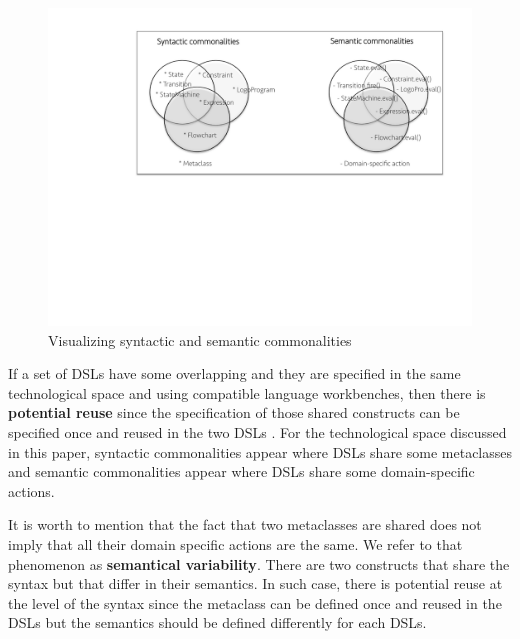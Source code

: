 \begin{figure}
\centering
\includegraphics[width=1\linewidth]{images/domains-inaction.pdf}
\caption{Visualizing syntactic and semantic commonalities}
\label{fig:shape}
\end{figure}

If a set of DSLs have some overlapping and they are specified in the same technological space and using compatible language workbenches, then there is \textbf{potential reuse} since the specification of those shared constructs can be specified once and reused in the two DSLs \cite[p. 60-61]{voelter:2013}. For the technological space discussed in this paper, syntactic commonalities appear where DSLs share some metaclasses and semantic commonalities appear where DSLs share some domain-specific actions.


It is worth to mention that the fact that two metaclasses are shared does not imply that all their domain specific actions are the same. We refer to that phenomenon as \textbf{semantical variability}. There are two constructs that share the syntax but that differ in their semantics. In such case, there is potential reuse at the level of the syntax since the metaclass can be defined once and reused in the DSLs but the semantics should be defined differently for each DSLs. 

